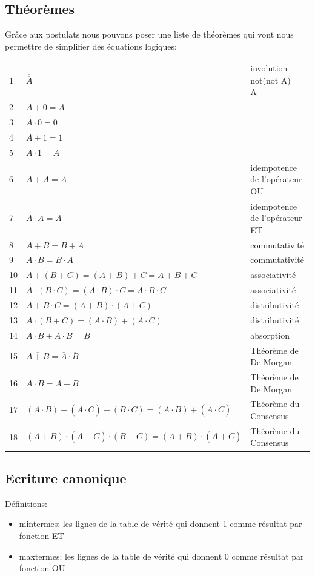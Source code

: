 \subsection{Théorèmes}
Grâce aux postulats nous pouvons poser une liste de théorèmes qui vont nous permettre de simplifier des équations logiques:

\begin{center}
\begin{tabular}{p{1cm} p{8cm} p{5cm}} 
1&$\overline{\overline{A}}$ &involution not(not A) = A\\
2&$A + 0=A$ &\\
3&$A \cdot 0=0$ &\\
4&$A + 1=1$ &\\
5&$A \cdot 1=A$ &\\
6&$A + A=A$ &idempotence de l'opérateur OU\\
7&$A \cdot A=A$ &idempotence de l'opérateur ET\\
8&$A + B = B + A$ &commutativité\\
9&$A \cdot B=B \cdot A$ &commutativité\\
10&$A +(B + C) = (A + B)+ C = A+B+C$ &associativité\\
11&$A \cdot (B \cdot C)= (A \cdot B) \cdot C = A\cdot B\cdot C$ &associativité\\
12&$A + B \cdot C= (A + B) \cdot (A + C)$ &distributivité\\
13&$A \cdot (B + C)= (A \cdot B) + (A \cdot C)$ &distributivité\\
14&$A \cdot B + \overline{A} \cdot B = B$ &absorption\\
15&$\overline{A + B} = \overline{A} \cdot \overline{B}$ &Théorème de De Morgan\\
16&$\overline{A \cdot B} = \overline{A} + \overline{B}$ &Théorème de De Morgan\\
17&$(A \cdot B) + (\overline{A} \cdot C) + (B \cdot C) = (A \cdot B) + (\overline{A} \cdot C)$ &Théorème du Consensus\\
18&$(A + B) \cdot (\overline{A} + C) \cdot (B + C) = (A + B) \cdot (\overline{A} + C)$ &Théorème du Consensus\\
\end{tabular}
\end{center}

\subsection{Ecriture canonique}

Définitions:
\begin{itemize}[label=\textbullet,font=\small]
\item mintermes: les lignes de la table de vérité qui donnent 1 comme résultat par fonction ET
\item maxtermes: les lignes de la table de vérité qui donnent 0 comme résultat par fonction OU
\end{itemize}

